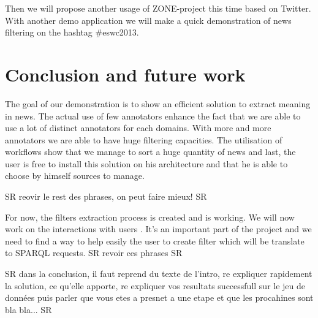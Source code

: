\documentclass{llncs}
\begin{document}
Then we will propose another usage of ZONE-project this time based on Twitter. With another demo application we will make a quick demonstration of news filtering on the hashtag \#eswc2013.

\section{Conclusion and future work}
%
The goal of our demonstration is to show an efficient solution to extract meaning in news. The actual use of few annotators enhance the fact that we are able to use a lot of distinct annotators for each domains. With more and more annotators we are able to have huge filtering capacities. The utilisation of workflows show that we manage to sort a huge quantity of news and last, the user is free to install this solution on his architecture and that he is able to choose by himself sources to manage.


SR reovir le rest des phrases, on peut faire mieux! SR

For now, the filters extraction process is created and is working. We will now work on the interactions with users . It's an important part of the project and we need to find a way to help easily the user to create filter which will be translate to SPARQL requests. SR revoir ces phrases SR

SR dans la conclusion, il faut reprend du texte de l'intro, re expliquer rapidement la solution, ce qu'elle apporte, re expliquer vos resultats successfull sur le jeu de données puis parler que vous etes a presnet a une etape et que les procahines sont bla bla... SR
\end{document}
